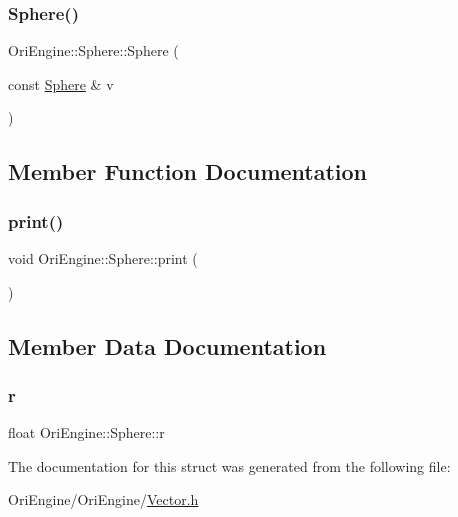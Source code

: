 \hypertarget{struct_ori_engine_1_1_sphere_aaff2b5e8886e1a2e4b17b0e615c1f2e7}{}\label{struct_ori_engine_1_1_sphere_aaff2b5e8886e1a2e4b17b0e615c1f2e7} 
\subsubsection{\texorpdfstring{Sphere()}{Sphere()}\hspace{0.1cm}{\footnotesize\ttfamily [3/3]}}
{\footnotesize\ttfamily Ori\+Engine\+::\+Sphere\+::\+Sphere (\begin{DoxyParamCaption}\item[{const \hyperlink{struct_ori_engine_1_1_sphere}{Sphere} \&}]{v }\end{DoxyParamCaption})\hspace{0.3cm}{\ttfamily [inline]}}



\subsection{Member Function Documentation}
\hypertarget{struct_ori_engine_1_1_sphere_a35400ef1bae1de87d1ccc6dfe9b3b5be}{}\label{struct_ori_engine_1_1_sphere_a35400ef1bae1de87d1ccc6dfe9b3b5be} 
\subsubsection{\texorpdfstring{print()}{print()}}
{\footnotesize\ttfamily void Ori\+Engine\+::\+Sphere\+::print (\begin{DoxyParamCaption}{ }\end{DoxyParamCaption})\hspace{0.3cm}{\ttfamily [inline]}}



\subsection{Member Data Documentation}
\hypertarget{struct_ori_engine_1_1_sphere_a24c8eda50b041688fd57b2b3c1305726}{}\label{struct_ori_engine_1_1_sphere_a24c8eda50b041688fd57b2b3c1305726} 
\subsubsection{\texorpdfstring{r}{r}}
{\footnotesize\ttfamily float Ori\+Engine\+::\+Sphere\+::r}



The documentation for this struct was generated from the following file\+:\begin{DoxyCompactItemize}
\item 
Ori\+Engine/\+Ori\+Engine/\hyperlink{_vector_8h}{Vector.\+h}\end{DoxyCompactItemize}

